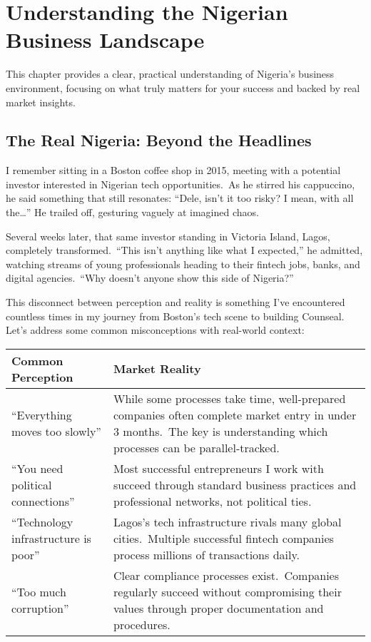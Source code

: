 \chapter{Understanding the Nigerian Business Landscape}\label{ch:understanding-the-nigerian-business-landscape}

\begin{importantbox}
This chapter provides a clear, practical understanding of Nigeria's business environment, focusing on what truly matters for your success and backed by real market insights.
\end{importantbox}

\section{The Real Nigeria: Beyond the Headlines}\label{sec:the-real-nigeria:-beyond-the-headlines}

I remember sitting in a Boston coffee shop in 2015, meeting with a potential investor interested in Nigerian tech opportunities.\ As he stirred his cappuccino, he said something that still resonates: ``Dele, isn't it too risky?
I mean, with all the\ldots'' He trailed off, gesturing vaguely at imagined chaos.

Several weeks later, that same investor standing in Victoria Island, Lagos, completely transformed.\ ``This isn't anything like what I expected,'' he admitted, watching streams of young professionals heading to their fintech jobs, banks, and digital agencies.\ ``Why doesn't anyone show this side of Nigeria?''

This disconnect between perception and reality is something I've encountered countless times in my journey from Boston's tech scene to building Counseal.
Let's address some common misconceptions with real-world context:

\begin{center}
\begin{tabularx}{\textwidth}{>{\raggedright\arraybackslash}X >{\raggedright\arraybackslash}X}
    \toprule
    \textbf{Common Perception} & \textbf{Market Reality} \\
    \midrule
    ``Everything moves too slowly'' & While some processes take time, well-prepared companies often complete market entry in under 3 months.\ The key is understanding which processes can be parallel-tracked. \\
    \addlinespace
    ``You need political connections'' & Most successful entrepreneurs I work with succeed through standard business practices and professional networks, not political ties. \\
    \addlinespace
    ``Technology infrastructure is poor'' & Lagos's tech infrastructure rivals many global cities.\ Multiple successful fintech companies process millions of transactions daily. \\
    \addlinespace
    ``Too much corruption'' & Clear compliance processes exist.\ Companies regularly succeed without compromising their values through proper documentation and procedures. \\
    \bottomrule
\end{tabularx}
\end{center}


